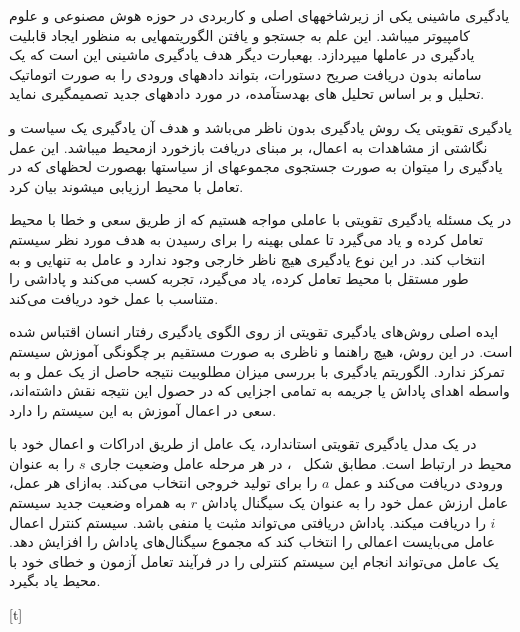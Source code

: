 
یادگیری ماشینی یکی از زیرشاخههای اصلی و کاربردی در حوزه هوش مصنوعی و علوم کامپیوتر میباشد. این علم به جستجو و یافتن الگوریتمهایی به منظور ایجاد قابلیت یادگیری در عاملها میپردازد. بهعبارت دیگر هدف یادگیری ماشینی این است که یک سامانه بدون دریافت صریح دستورات، بتواند دادههای ورودی را به صورت اتوماتیک تحلیل و بر اساس تحلیل های بهدستآمده، در مورد دادههای جدید
تصمیمگیری نماید.


یادگیری تقویتی یک روش یادگیری بدون ناظر می‌باشد و هدف آن یادگیری یک سیاست و نگاشتی از مشاهدات به اعمال، بر مبنای دریافت بازخورد ازمحیط میباشد. این عمل یادگیری را میتوان به صورت جستجوی مجموعهای از سیاستها بهصورت لحظهای که در تعامل با محیط ارزیابی میشوند بیان کرد.

در یک مسئله یادگیری تقویتی با عاملی مواجه هستیم که از طریق سعی و خطا با محیط تعامل کرده و یاد می‌گیرد تا عملی بهینه را برای رسیدن به هدف مورد نظر سیستم انتخاب کند. در این نوع یادگیری هیچ ناظر خارجی وجود ندارد و عامل به تنهایی و به طور مستقل با محیط تعامل کرده، یاد می‌گیرد، تجربه کسب
می‌کند و پاداشی را متناسب با عمل خود دریافت می‌کند.

ایده اصلی روش‌های یادگیری تقویتی از روی الگوی یادگیری رفتار انسان اقتباس شده است. در این
روش، هیچ راهنما و ناظری به صورت مستقیم بر چگونگی آموزش سیستم تمرکز ندارد. الگوریتم یادگیری با بررسی میزان مطلوبیت نتیجه حاصل از یک عمل و به واسطه اهدای پاداش یا جریمه به تمامی اجزایی که در
حصول این نتیجه نقش داشته‌اند، سعی در اعمال آموزش به این سیستم را دارد.


در یک مدل یادگیری تقویتی استاندارد، یک عامل از طریق ادراکات و اعمال خود با محیط در ارتباط
است. مطابق شکل ~، در هر مرحله عامل وضعیت جاری $s$ را به عنوان ورودی دریافت می‌کند و عمل $a$ را برای تولید خروجی انتخاب می‌کند.
به‌ازای هر عمل، عامل ارزش عمل خود را به عنوان یک سیگنال پاداش
$r$ به همراه وضعیت جدید سیستم $i$ را دریافت میکند. پاداش دریافتی می‌تواند مثبت یا منفی باشد. سیستم  کنترل اعمال عامل می‌بایست اعمالی را انتخاب کند که مجموع سیگنال‌های پاداش را افزایش دهد. یک عامل
می‌تواند انجام این سیستم کنترلی را در فرآیند تعامل آزمون و خطای خود با محیط یاد بگیرد.

[t]
